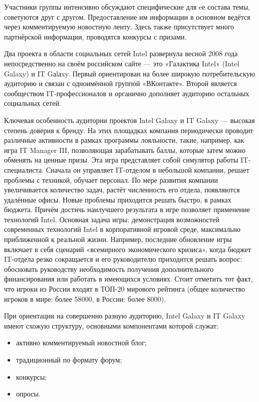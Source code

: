 \documentclass[a4paper,english,russian]{G2-105}
\begin{document}
\par Участники группы интенсивно обсуждают специфические для eе состава темы, советуются друг с другом. Предоставление им информации в основном ведётся через комментируемую новостную ленту. Здесь также присутствует много партнёрской информации, проводятся конкурсы с призами.
\par Два проекта в области социальных сетей Intel развернула весной 2008 года непосредственно на своём российском сайте --- это «Галактика Intel» (Intel Galaxy) и IT Gаlаxy. Первый ориентирован на более широкую потребительскую аудиторию и связан с одноимённой группой «ВКонтакте». Второй является сообществом IT-профессионалов и органично дополняет аудиторию остальных социальных сетей.
\par Ключевая особенность аудитории проектов Intel Galaxy и IT Galaxy --- высокая степень доверия к бренду. На этих площадках компания периодически проводит различные активности в рамках программы лояльности, такие, например, как игра IT Manager III, позволяющая зарабатывать баллы, которые затем можно обменять на ценные призы. Эта игра представляет собой симулятор работы IT-специалиста. Сначала он управляет IT-отделом в небольшой компании, решает проблемы с техникой, обучает персонал. По мере развития компании увеличивается количество задач, растёт численность его отдела, появляются удалённые офисы. Новые проблемы приходится решать быстро, в рамках бюджета. Причём достичь наилучшего результата в игре позволяет применение технологий Intel. Основная задача игры: демонстрация возможностей современных технологий Intel в корпоративной игровой среде, максимально приближенной к реальной жизни. Например, последние обновление игры включает в себя сценарий «всемирного экономического кризиса», когда бюджет IT-отдела резко сокращается и его руководителю приходится решать вопрос: обосновать руководству необходимость получения дополнительного финансирования или работать в имеющихся условиях. Стоит отметить тот факт, что игроки из России входят в ТОП-20 мирового рейтинга (общее количество игроков в мире: более 58000, в России: более 8000).
\par При ориентации на совершенно разную аудиторию, Intel Galaxy и IT Galaxy имеют схожую структуру, основными компонентами которой служат:
\begin{itemize}
\item активно комментируемый новостной блог;
\item традиционный по формату форум;
\item конкурсы;
\item опросы.
\end{itemize}
\end{document}
